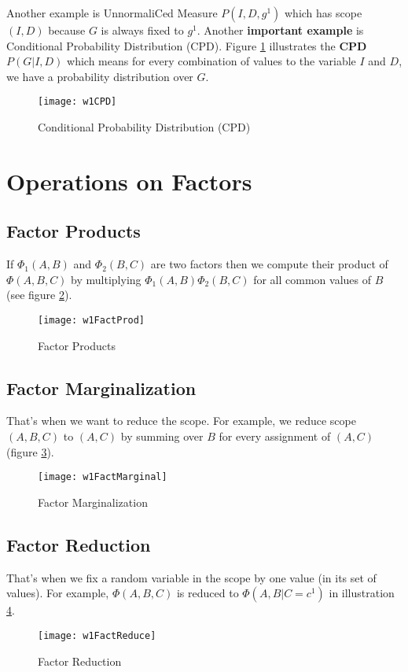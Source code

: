 Another example is UnnormaliCed Measure $P(I,D,g^1)$ which has scope $(I,D)$ because $G$ is always fixed to $g^1$. Another \textbf{important example} is Conditional Probability Distribution (CPD). Figure \ref{w1CPD} illustrates the \textbf{CPD} $P(G | I, D)$ which means for every combination of values to the variable $I$ and $D$, we have a probability distribution over $G$.  

\begin{figure}[!ht]
\centering
\texttt{[image: w1CPD]}
\caption{Conditional Probability Distribution (CPD)}
\label{w1CPD}
\end{figure}

\section{Operations on Factors}
\subsection{Factor Products}
If $\Phi_1(A,B)$ and $\Phi_2(B,C)$ are two factors then we compute their product of $\Phi(A,B,C)$ by multiplying $\Phi_1(A,B)\Phi_2(B,C)$ for all common values of $B$ (see figure \ref{w1FactProd}).

\begin{figure}[!ht]
\centering
\texttt{[image: w1FactProd]}
\caption{Factor Products}
\label{w1FactProd}
\end{figure}

\subsection{Factor Marginalization}
That's when we want to reduce the scope. For example, we reduce scope $(A,B,C)$ to $(A,C)$ by summing over $B$ for every assignment of $(A,C)$ (figure \ref{w1FactMarginal}).

\begin{figure}[!ht]
\centering
\texttt{[image: w1FactMarginal]}
\caption{Factor Marginalization}
\label{w1FactMarginal}
\end{figure}

\subsection{Factor Reduction}
That's when we fix a random variable in the scope by one value (in its set of values). For example, $\Phi(A,B,C)$ is reduced to $\Phi(A,B | C = c^1)$ in illustration \ref{w1FactReduce}.
\begin{figure}[!ht]
\centering
\texttt{[image: w1FactReduce]}
\caption{Factor Reduction}
\label{w1FactReduce}
\end{figure}

